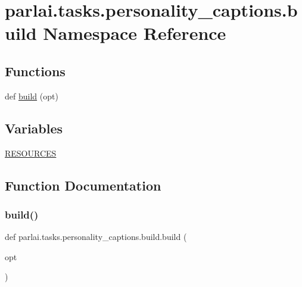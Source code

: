 \hypertarget{namespaceparlai_1_1tasks_1_1personality__captions_1_1build}{}\section{parlai.\+tasks.\+personality\+\_\+captions.\+build Namespace Reference}
\label{namespaceparlai_1_1tasks_1_1personality__captions_1_1build}
\subsection*{Functions}
\begin{DoxyCompactItemize}
\item 
def \hyperlink{namespaceparlai_1_1tasks_1_1personality__captions_1_1build_a74a7207f7a37bbac7c1f1b17bb5a2080}{build} (opt)
\end{DoxyCompactItemize}
\subsection*{Variables}
\begin{DoxyCompactItemize}
\item 
\hyperlink{namespaceparlai_1_1tasks_1_1personality__captions_1_1build_a01ca1cbf21a409d302ebcc1df913dcbb}{R\+E\+S\+O\+U\+R\+C\+ES}
\end{DoxyCompactItemize}


\subsection{Function Documentation}
\mbox{\label{namespaceparlai_1_1tasks_1_1personality__captions_1_1build_a74a7207f7a37bbac7c1f1b17bb5a2080}} 
\subsubsection{\texorpdfstring{build()}{build()}}
{\footnotesize\ttfamily def parlai.\+tasks.\+personality\+\_\+captions.\+build.\+build (\begin{DoxyParamCaption}\item[{}]{opt }\end{DoxyParamCaption})}



